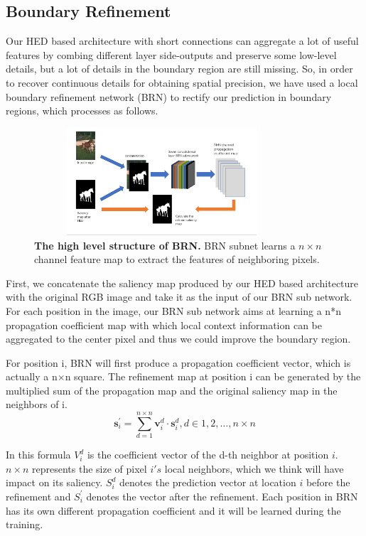 \documentclass[10pt,journal, compsoc]{IEEEtran}
\begin{document}
\subsection{Boundary Refinement}

Our HED based architecture with short connections can aggregate a lot of useful features by combing different layer side-outputs and preserve some low-level details, but a lot of details in the boundary region are still missing. So, in order to recover continuous details for obtaining spatial precision, we have used a local boundary refinement network (BRN)\cite{wang2018detect} to rectify our prediction in boundary regions, which processes as follows.

\begin{figure}[htbp]
	\centering
	\includegraphics[height=4cm,width=9.5cm]{figures/brn.png}
	\caption{\textbf{The high level structure of BRN.} BRN subnet learns a $n\times n$ channel feature map to extract the features of neighboring pixels.}
\end{figure}

First, we concatenate the saliency map produced by our HED based architecture with the original RGB image and take it as the input of our BRN sub network. For each position in the image, our BRN sub network aims at learning a n*n propagation coefficient map with which local context information can be aggregated to the center pixel and thus we could improve the boundary region.

For position i, BRN will first produce a propagation coefficient vector, which is actually a n$\times$n square. The refinement map at position i can be generated by the multiplied sum of the propagation map and the original saliency map in the neighbors of i.
\begin{equation}
\mathbf { s } _ { i } ^ { \prime } = \sum _ { d = 1 } ^ { n \times n } \mathbf { v } _ { i } ^ { d } \cdot \mathbf { s } _ { i } ^ { d } , d \in 1,2 , \dots , n \times n
\end{equation}

In this formula $V_i^d$ is the coefficient vector of the d-th neighbor at position $i$. $n\times n$ represents the size of pixel $i's$  local neighbors, which we think will have impact on its saliency. $S_i^d$ denotes the prediction vector at location $i$ before the refinement and $S_i^{\prime}$ denotes the vector after the refinement. Each position in BRN has its own different propagation coefficient and it will be learned during the training.
\end{document}
